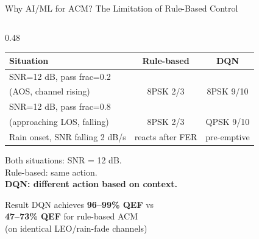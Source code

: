 \documentclass[aspectratio=169,10pt]{beamer}
\begin{document}
\begin{frame}[shrink=5]{Why AI/ML for ACM? The Limitation of Rule-Based Control}
\begin{columns}[T]
\begin{column}{0.48\textwidth}
      {\scriptsize
      \begin{tabular}{p{2.8cm}cc}
        \toprule
        \textbf{Situation} & \textbf{Rule-based} & \textbf{DQN}\\
        \midrule
        SNR=12 dB, pass frac=0.2\\(AOS, channel rising)
          & 8PSK 2/3 & \alert{8PSK 9/10}\\[3pt]
        SNR=12 dB, pass frac=0.8\\(approaching LOS, falling)
          & 8PSK 2/3 & \alert{QPSK 9/10}\\[3pt]
        Rain onset, SNR falling 2 dB/s
          & reacts after FER & \alert{pre-emptive}\\[3pt]
        \bottomrule
      \end{tabular}}

      \vspace{0.4em}
      Both situations: SNR = 12 dB.\\
      \alert{Rule-based: same action.}\\
      \textbf{DQN: different action based on context.}

      \vspace{0.4em}
      \begin{resultbox}{Result}
        \scriptsize DQN achieves \textbf{96--99\% QEF} vs\\
        \textbf{47--73\% QEF} for rule-based ACM\\
        (on identical LEO/rain-fade channels)
      \end{resultbox}
    \end{column}
  \end{columns}
\end{frame}
\end{document}
